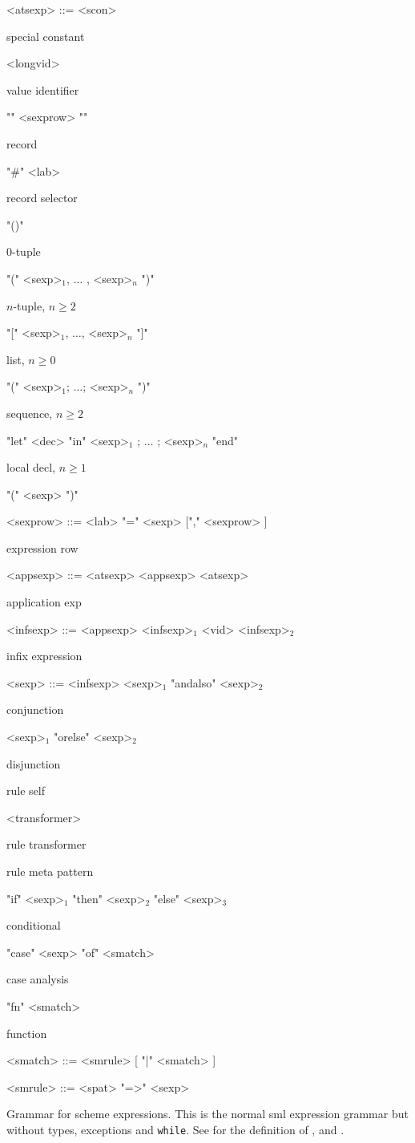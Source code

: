 \begin{nonfloatingtable}

\setlength{\grammarindent}{7em}

\newcommand{\cmt}[1]{\parbox{8em}{\small{#1}}}

\begin{grammar}
 
  <atsexp> ::= <scon>                                            \hfill \cmt{special constant}
  \alt ["op"] <longvid>                                          \hfill \cmt{value identifier}
  \alt "{" <sexprow> "}"                                         \hfill \cmt{record}
  \alt "\#" <lab>                                                \hfill \cmt{record selector}
  \alt "()"                                                      \hfill \cmt{$0$-tuple}
  \alt "(" <sexp>$_1$, $\ldots$ , <sexp>$_n$ ")"                 \hfill \cmt{$n$-tuple, $n \geq 2$}
  \alt "[" <sexp>$_1$, $\ldots$, <sexp>$_n$ "]"                  \hfill \cmt{list, $n \geq 0$}
  \alt "(" <sexp>$_1$; $\ldots$; <sexp>$_n$ ")"                  \hfill \cmt{sequence, $n \geq 2$}  
  \alt "let" <dec> "in" <sexp>$_1$ ; $\ldots$ ; <sexp>$_n$ "end" \hfill \cmt{local decl, $n \geq 1$}
  \alt "(" <sexp> ")"
  
  <sexprow> ::= <lab> "=" <sexp> ["," <sexprow> ]          \hfill \cmt{expression row}

  <appsexp> ::= <atsexp>
  \alt <appsexp> <atsexp>                                  \hfill \cmt{application exp}

  <infsexp> ::= <appsexp>
  \alt <infsexp>$_1$ <vid> <infsexp>$_2$                   \hfill \cmt{infix expression}
  
  <sexp> ::= <infsexp>
  \alt <sexp>$_1$ "andalso" <sexp>$_2$                     \hfill \cmt{conjunction}
  \alt <sexp>$_1$ "orelse"  <sexp>$_2$                     \hfill \cmt{disjunction}
                                           \hfill \cmt{rule self}
  \alt <transformer>                                       \hfill \cmt{rule transformer}
                                   \hfill \cmt{rule meta pattern}
  \alt "if" <sexp>$_1$ "then" <sexp>$_2$ "else" <sexp>$_3$ \hfill \cmt{conditional}
  \alt "case" <sexp> "of" <smatch>                         \hfill \cmt{case analysis}
  \alt "fn" <smatch>                                       \hfill \cmt{function}
  
  <smatch> ::= <smrule> [ "|" <smatch> ]
  
  <smrule> ::= <spat> "=>" <sexp>
\end{grammar}

  \caption{Grammar for scheme expressions. This is the normal sml expression
    grammar but without types, exceptions and \texttt{while}.  See  for
    the definition of ,  and .}
  \label{tab:scheme-expressions}
\end{nonfloatingtable}


